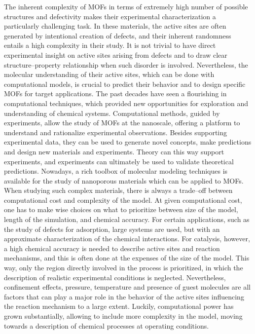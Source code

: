 \npar
The inherent complexity of MOFs in terms of extremely high number of possible structures and defectivity makes their experimental characterization a particularly challenging task. In these materials, the active sites are often generated by intentional creation of defects, and their inherent randomness entails a high complexity in their study. It is not trivial to have direct experimental insight on active sites arising from defects and to draw clear structure--property relationship when such disorder is involved. Nevertheless, the molecular understanding of their active sites, which can be done with computational models, is crucial to predict their behavior and to design specific MOFs for target applications. The past decades have seen a flourishing in computational techniques, which provided new opportunities for exploration and understanding of chemical systems. Computational methods, guided by experiments, allow the study of MOFs at the nanoscale, offering a platform to understand and rationalize experimental observations. Besides supporting experimental data, they can be used to generate novel concepts, make predictions and design new materials and experiments. Theory can this way support experiments, and experiments can ultimately be used to validate theoretical predictions. 
\npar
Nowadays, a rich toolbox of molecular modeling techniques is available for the study of nanoporous materials which can be applied to MOFs. When studying such complex materials, there is always a trade--off between computational cost and complexity of the model. At given computational cost, one has to make wise choices on what to prioritize between size of the model, length of the simulation, and chemical accuracy. For certain applications, such as the study of defects for adsorption, large systems are used, but with an approximate characterization of the chemical interactions. For catalysis, however, a high chemical accuracy is needed to describe active sites and reaction mechanisms, and this is often done at the expenses of the size of the model. This way, only the region directly involved in the process is prioritized, in which the description of realistic experimental conditions is neglected. Nevertheless, confinement effects, pressure, temperature and presence of guest molecules are all factors that can play a major role in the behavior of the active sites influencing the reaction mechanism to a large extent. Luckily, computational power has grown substantially, allowing to include more complexity in the model, moving towards a description of chemical processes at operating conditions.
